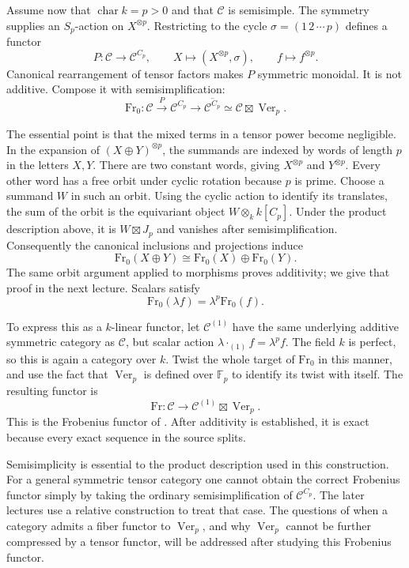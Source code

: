 Assume now that $\operatorname{char}k=p>0$ and that $\mathcal C$ is
semisimple. The symmetry supplies an $S_p$-action on $X^{\otimes p}$.
Restricting to the cycle $\sigma=(1\,2\,\cdots\,p)$ defines a
functor
\[
 P:\mathcal C\longrightarrow\mathcal C^{C_p},\qquad
 X\longmapsto(X^{\otimes p},\sigma),\qquad
 f\longmapsto f^{\otimes p}.
\]
Canonical rearrangement of tensor factors makes $P$ symmetric
monoidal. It is not additive. Compose it with semisimplification:
\[
 \mathrm{Fr}_0:\mathcal C\xrightarrow{P}\mathcal C^{C_p}
 \longrightarrow\overline{\mathcal C^{C_p}}
 \simeq\mathcal C\boxtimes\operatorname{Ver}_p.
\]

The essential point is that the mixed terms in a tensor power become
negligible. In the expansion of $(X\oplus Y)^{\otimes p}$, the
summands are indexed by words of length $p$ in the letters $X,Y$.
There are two constant words, giving $X^{\otimes p}$ and
$Y^{\otimes p}$. Every other word has a free orbit under cyclic
rotation because $p$ is prime. Choose a summand $W$ in such an
orbit. Using the cyclic action to identify its translates, the sum
of the orbit is the equivariant object $W\otimes_k k[C_p]$.
Under the product description above, it is $W\boxtimes J_p$ and
vanishes after semisimplification. Consequently the canonical
inclusions and projections induce
\[
 \mathrm{Fr}_0(X\oplus Y)
 \cong\mathrm{Fr}_0(X)\oplus\mathrm{Fr}_0(Y).
\]
The same orbit argument applied to morphisms proves additivity; we
give that proof in the next lecture. Scalars satisfy
\[
 \mathrm{Fr}_0(\lambda f)=\lambda^p\mathrm{Fr}_0(f).
\]

To express this as a $k$-linear functor, let $\mathcal C^{(1)}$ have
the same underlying additive symmetric category as $\mathcal C$,
but scalar action $\lambda\mathbin{\cdot_{(1)}}f=\lambda^p f$.
The field $k$ is perfect, so this is again a category over $k$.
Twist the whole target of $\mathrm{Fr}_0$ in this manner, and use
the fact that $\operatorname{Ver}_p$ is defined over $\mathbb F_p$
to identify its twist with itself. The resulting functor is
\[
 \mathrm{Fr}:\mathcal C\longrightarrow
 \mathcal C^{(1)}\boxtimes\operatorname{Ver}_p.
\]
This is the Frobenius functor of
\cite[Section 3.3]{OstrikVerlinde}. After additivity is established,
it is exact because every exact sequence in the source splits.

\begin{remark}
Semisimplicity is essential to the product description used in this
construction. For a general symmetric tensor category one cannot
obtain the correct Frobenius functor simply by taking the ordinary
semisimplification of $\mathcal C^{C_p}$. The later lectures use a
relative construction to treat that case. The questions of when a
category admits a fiber functor to $\operatorname{Ver}_p$, and why
$\operatorname{Ver}_p$ cannot be further compressed by a tensor
functor, will be addressed after studying this Frobenius functor.
\end{remark}
